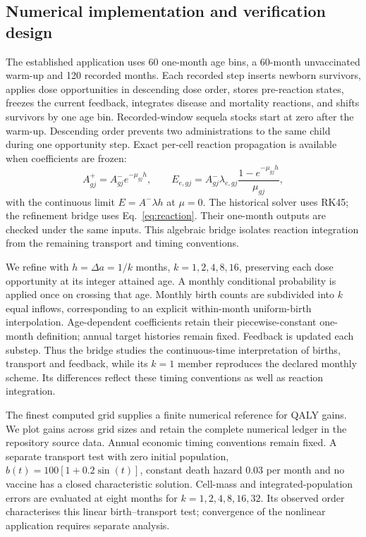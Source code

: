 \documentclass[10pt,letterpaper]{article}
\begin{document}
\subsection{Numerical implementation and verification design}
The established application uses 60 one-month age bins, a 60-month unvaccinated warm-up and 120 recorded months. Each recorded step inserts newborn survivors, applies dose opportunities in descending dose order, stores pre-reaction states, freezes the current feedback, integrates disease and mortality reactions, and shifts survivors by one age bin. Recorded-window sequela stocks start at zero after the warm-up. Descending order prevents two administrations to the same child during one opportunity step. Exact per-cell reaction propagation is available when coefficients are frozen:
\begin{equation}
 A_{gj}^{+}=A_{gj}^{-}e^{-\mu_{gj}h},\qquad
 E_{e,gj}=A_{gj}^{-}\lambda_{e,gj}\frac{1-e^{-\mu_{gj}h}}{\mu_{gj}},
 \label{eq:reaction}
\end{equation}
with the continuous limit $E=A^-\lambda h$ at $\mu=0$. The historical solver uses RK45; the refinement bridge uses Eq.~\ref{eq:reaction}. Their one-month outputs are checked under the same inputs. This algebraic bridge isolates reaction integration from the remaining transport and timing conventions.

We refine with $h=\Delta a=1/k$ months, $k=1,2,4,8,16$, preserving each dose opportunity at its integer attained age. A monthly conditional probability is applied once on crossing that age. Monthly birth counts are subdivided into $k$ equal inflows, corresponding to an explicit within-month uniform-birth interpolation. Age-dependent coefficients retain their piecewise-constant one-month definition; annual target histories remain fixed. Feedback is updated each substep. Thus the bridge studies the continuous-time interpretation of births, transport and feedback, while its $k=1$ member reproduces the declared monthly scheme. Its differences reflect these timing conventions as well as reaction integration.

The finest computed grid supplies a finite numerical reference for QALY gains. We plot gains across grid sizes and retain the complete numerical ledger in the repository source data. Annual economic timing conventions remain fixed. A separate transport test with zero initial population, $b(t)=100[1+0.2\sin(t)]$, constant death hazard $0.03$ per month and no vaccine has a closed characteristic solution. Cell-mass and integrated-population errors are evaluated at eight months for $k=1,2,4,8,16,32$. Its observed order characterises this linear birth--transport test; convergence of the nonlinear application requires separate analysis.
\end{document}
